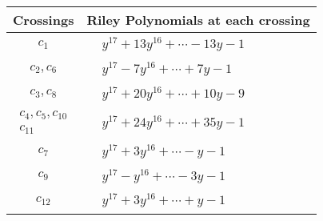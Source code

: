 \documentclass[1p]{elsarticle_modified}
\theoremstyle{definition}
\begin{document}
\begin{tabular}{m{50pt}|m{274pt}}
Crossings & \hspace{64pt}Riley Polynomials at each crossing \\
\hline $$\begin{aligned}c_{1}\end{aligned}$$&$\begin{aligned}
&y^{17}+13 y^{16}+\cdots-13 y-1
\end{aligned}$\\
\hline $$\begin{aligned}c_{2},c_{6}\end{aligned}$$&$\begin{aligned}
&y^{17}-7 y^{16}+\cdots+7 y-1
\end{aligned}$\\
\hline $$\begin{aligned}c_{3},c_{8}\end{aligned}$$&$\begin{aligned}
&y^{17}+20 y^{16}+\cdots+10 y-9
\end{aligned}$\\
\hline $$\begin{aligned}c_{4},c_{5},c_{10}\\c_{11}\end{aligned}$$&$\begin{aligned}
&y^{17}+24 y^{16}+\cdots+35 y-1
\end{aligned}$\\
\hline $$\begin{aligned}c_{7}\end{aligned}$$&$\begin{aligned}
&y^{17}+3 y^{16}+\cdots- y-1
\end{aligned}$\\
\hline $$\begin{aligned}c_{9}\end{aligned}$$&$\begin{aligned}
&y^{17}- y^{16}+\cdots-3 y-1
\end{aligned}$\\
\hline $$\begin{aligned}c_{12}\end{aligned}$$&$\begin{aligned}
&y^{17}+3 y^{16}+\cdots+y-1
\end{aligned}$\\
\hline
\end{tabular}\\~\\
\end{document}
